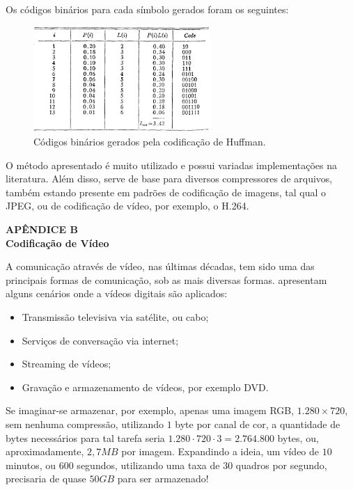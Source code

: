 \documentclass[cic,tc]{iiufrgs}
\begin{document}
Os códigos binários para cada símbolo gerados foram os seguintes:
\begin{figure}[H]
    \caption{Códigos binários gerados pela codificação de Huffman.}
    \begin{center}
        \includegraphics[width=0.6\textwidth]{img/huffmantable.png}
    \end{center}
\end{figure}

O método apresentado é muito utilizado e possui variadas implementações na 
literatura.
Além disso, serve de base para diversos compressores de arquivos, também 
estando presente em padrões de codificação de imagens, tal qual o JPEG, 
ou de codificação de vídeo, por exemplo, o H.264.
\newpage
{
    \centering
    \textbf{APÊNDICE B} \\
    \textbf{Codificação de Vídeo} \par
}
\vspace{1em}

A comunicação através de vídeo, nas últimas décadas, tem sido uma das principais formas
de comunicação, sob as mais diversas formas.
\citet{SullivanH264} apresentam alguns cenários onde a vídeos digitais são aplicados:
\begin{itemize}
    \item Transmissão televisiva via satélite, ou cabo;
    \item Serviços de conversação via internet;
    \item Streaming de vídeos;
    \item Gravação e armazenamento de vídeos, por exemplo DVD.
\end{itemize}

Se imaginar-se armazenar, por exemplo, apenas uma imagem RGB, $1.280\times720$, 
sem nenhuma compressão, utilizando $1$ byte por canal de cor, a quantidade de bytes necessários 
para tal tarefa seria $1.280\cdot720\cdot3 = 2.764.800$ bytes, ou, aproximadamente, $2,7MB$
por imagem.
Expandindo a ideia, um vídeo de $10$ minutos, ou $600$ segundos, 
utilizando uma taxa de $30$ quadros por segundo,
precisaria de quase $50GB$ para ser armazenado!
\end{document}
